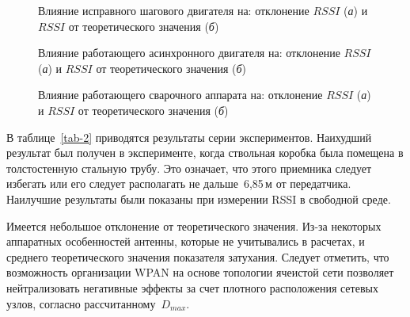 \begin{figure} [htb]
	\caption[Влияние исправного шагового двигателя на: отклонение $RSSI$ и $RSSI$ от теоретического значения]
	{Влияние исправного шагового двигателя на: отклонение $RSSI$ (\textit{а}) и $RSSI$ от теоретического значения (\textit{б})}
	\label{ch-3/fig-8}
\end{figure}

\begin{figure} [htb]
	\caption[Влияние работающего асинхронного двигателя на: отклонение $RSSI$ и $RSSI$ от теоретического значения]
	{Влияние работающего асинхронного двигателя на: отклонение $RSSI$ (\textit{а}) и $RSSI$ от теоретического значения (\textit{б})}
	\label{ch-3/fig-9}
\end{figure}

\begin{figure} [htb]
	\caption[Влияние работающего сварочного аппарата на: отклонение $RSSI$ и $RSSI$ от теоретического значения]
	{Влияние работающего сварочного аппарата на: отклонение $RSSI$ (\textit{а}) и $RSSI$ от теоретического значения (\textit{б})}
	\label{ch-3/fig-10}
\end{figure}

В таблице~\cref{tab-2} приводятся результаты серии экспериментов. Наихудший результат был получен в эксперименте, когда ствольная коробка была помещена в толстостенную стальную трубу. Это означает, что этого приемника следует избегать или его следует располагать не дальше~6,85\,м от передатчика. Наилучшие результаты были показаны при измерении RSSI в свободной среде.

Имеется небольшое отклонение от теоретического значения. Из-за некоторых аппаратных особенностей антенны, которые не учитывались в расчетах, и среднего теоретического значения показателя затухания. Следует отметить, что возможность организации WPAN на основе топологии ячеистой сети позволяет нейтрализовать негативные эффекты за счет плотного расположения сетевых узлов, согласно рассчитанному~$D_{max}$.

